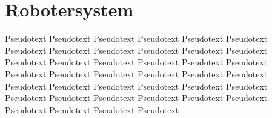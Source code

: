 \chapter{Robotersystem}
Pseudotext Pseudotext Pseudotext Pseudotext Pseudotext Pseudotext Pseudotext Pseudotext Pseudotext Pseudotext Pseudotext Pseudotext Pseudotext Pseudotext Pseudotext Pseudotext Pseudotext Pseudotext Pseudotext Pseudotext Pseudotext Pseudotext Pseudotext Pseudotext Pseudotext Pseudotext Pseudotext Pseudotext Pseudotext Pseudotext Pseudotext Pseudotext Pseudotext Pseudotext Pseudotext Pseudotext Pseudotext Pseudotext Pseudotext Pseudotext 



